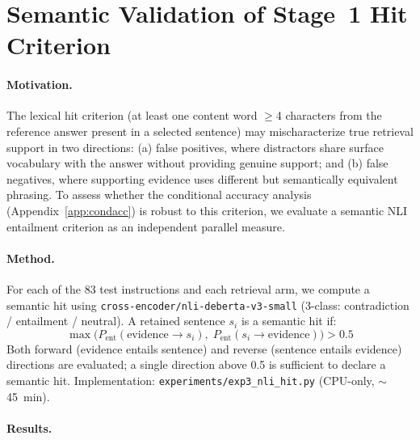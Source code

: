 \documentclass{article}
\begin{document}

\section{Semantic Validation of Stage~1 Hit Criterion}
\label{app:nli}

\paragraph{Motivation.}
The lexical hit criterion (at least one content word $\geq$4 characters from
the reference answer present in a selected sentence) may mischaracterize
true retrieval support in two directions: (a) false positives, where
distractors share surface vocabulary with the answer without providing
genuine support; and (b) false negatives, where supporting evidence uses
different but semantically equivalent phrasing. To assess whether the
conditional accuracy analysis (Appendix~\ref{app:condacc}) is robust to
this criterion, we evaluate a semantic NLI entailment criterion as an
independent parallel measure.

\paragraph{Method.}
For each of the 83 test instructions and each retrieval arm, we compute
a semantic hit using \texttt{cross-encoder/nli-deberta-v3-small} (3-class:
contradiction / entailment / neutral). A retained sentence $s_i$ is a
semantic hit if:
\begin{equation}
  \max\!\bigl(P_{\mathrm{ent}}(\text{evidence} \to s_i),\;
              P_{\mathrm{ent}}(s_i \to \text{evidence})\bigr) > 0.5
\end{equation}
Both forward (evidence entails sentence) and reverse (sentence entails
evidence) directions are evaluated; a single direction above 0.5 is
sufficient to declare a semantic hit. Implementation:
\texttt{experiments/exp3\_nli\_hit.py} (CPU-only, $\sim$45~min).

\paragraph{Results.}
\end{document}

